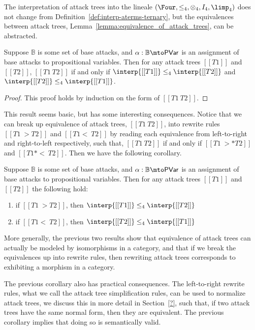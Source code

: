 The interpretation of attack trees into the lineale $(\Four, \leq_4,
\otimes_4, I_4, \limp_4)$ does not change from
Definition~\ref{def:interp-aterms-ternary}, but the equivalences
between attack trees, Lemma~\ref{lemma:equivalence_of_attack_trees},
can be abstracted.
\begin{lemma}
  \label{lemma:equivalence_of_attack_trees_lineale}
  Suppose $\mathbb{B}$ is some set of base attacks, and $\alpha :
  \mathbb{B} \mto \mathsf{PVar}$ is an assignment of base attacks to
  propositional variables.  Then for any attack trees $[[T1]]$ and
  $[[T2]]$, $[[T1 ~ T2]]$ if and only if $\interp{[[T1]]} \leq_4 \interp{[[T2]]}$ and
  $\interp{[[T2]]} \leq_4 \interp{[[T1]]}$.
\end{lemma}
\begin{proof}
  This proof holds by induction on the form of $[[T1 ~ T2]]$.
\end{proof}
This result seems basic, but has some interesting consequences.
Notice that we can break up equivalence of attack trees, $[[T1 ~
    T2]]$, into rewrite rules $[[T1 ~> T2]]$ and $[[T1 <~ T2]]$ by
reading each equivalence from left-to-right and right-to-left
respectively, such that, $[[T1 ~ T2]]$ if and only if $[[T1 ~>* T2]]$
and $[[T1 *<~ T2]]$.  Then we have the following corollary.
\begin{corollary}
  \label{corollary:attack_trees_rewrites_mor_lineale}
  Suppose $\mathbb{B}$ is some set of base attacks, and $\alpha :
  \mathbb{B} \mto \mathsf{PVar}$ is an assignment of base attacks to
  propositional variables.  Then for any attack trees $[[T1]]$ and
  $[[T2]]$ the following hold:
  \begin{enumerate}[label=\roman*.]
  \item if $[[T1 ~> T2]]$, then $\interp{[[T1]]} \leq_4 \interp{[[T2]]}$
  \item if $[[T1 <~ T2]]$, then $\interp{[[T2]]} \leq_4 \interp{[[T1]]}$
  \end{enumerate}
\end{corollary}
More generally, the previous two results show that equivalence of
attack trees can actually be modeled by isomorphisms in a category,
and that if we break the equivalences up into rewrite rules, then
rewriting attack trees corresponds to exhibiting a morphism in a
category.

The previous corollary also has practical consequences. The
left-to-right rewrite rules, what we call the attack tree
simplification rules, can be used to normalize attack trees, we
discuss this in more detail in Section~\ref{?}, such that, if two
attack trees have the same normal form, then they are equivalent.  The
previous corollary implies that doing so is semantically valid.

